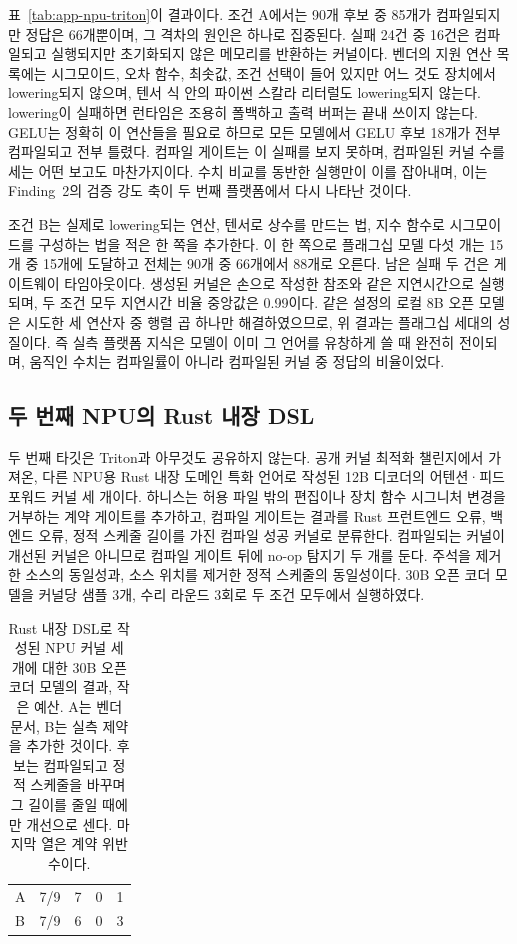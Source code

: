 표~\ref{tab:app-npu-triton}이 결과이다. 조건 A에서는 90개 후보 중 85개가 컴파일되지만 정답은 66개뿐이며,
그 격차의 원인은 하나로 집중된다. 실패 24건 중 16건은 컴파일되고 실행되지만 초기화되지 않은 메모리를
반환하는 커널이다. 벤더의 지원 연산 목록에는 시그모이드, 오차 함수, 최솟값, 조건 선택이 들어 있지만 어느
것도 장치에서 lowering되지 않으며, 텐서 식 안의 파이썬 스칼라 리터럴도 lowering되지 않는다. lowering이
실패하면 런타임은 조용히 폴백하고 출력 버퍼는 끝내 쓰이지 않는다. GELU는 정확히 이 연산들을 필요로 하므로
모든 모델에서 GELU 후보 18개가 전부 컴파일되고 전부 틀렸다. 컴파일 게이트는 이 실패를 보지 못하며,
컴파일된 커널 수를 세는 어떤 보고도 마찬가지이다. 수치 비교를 동반한 실행만이 이를 잡아내며, 이는
Finding~2의 검증 강도 축이 두 번째 플랫폼에서 다시 나타난 것이다.

조건 B는 실제로 lowering되는 연산, 텐서로 상수를 만드는 법, 지수 함수로 시그모이드를 구성하는 법을 적은
한 쪽을 추가한다. 이 한 쪽으로 플래그십 모델 다섯 개는 15개 중 15개에 도달하고 전체는 90개 중 66개에서
88개로 오른다. 남은 실패 두 건은 게이트웨이 타임아웃이다. 생성된 커널은 손으로 작성한 참조와 같은
지연시간으로 실행되며, 두 조건 모두 지연시간 비율 중앙값은 0.99이다. 같은 설정의 로컬 8B 오픈 모델은
시도한 세 연산자 중 행렬 곱 하나만 해결하였으므로, 위 결과는 플래그십 세대의 성질이다. 즉 실측 플랫폼
지식은 모델이 이미 그 언어를 유창하게 쓸 때 완전히 전이되며, 움직인 수치는 컴파일률이 아니라 컴파일된
커널 중 정답의 비율이었다.

\subsection{두 번째 NPU의 Rust 내장 DSL}\label{sec:app-npu-dsl}

두 번째 타깃은 Triton과 아무것도 공유하지 않는다. 공개 커널 최적화 챌린지에서 가져온, 다른 NPU용 Rust
내장 도메인 특화 언어로 작성된 12B 디코더의 어텐션·피드포워드 커널 세 개이다. 하니스는 허용 파일 밖의
편집이나 장치 함수 시그니처 변경을 거부하는 계약 게이트를 추가하고, 컴파일 게이트는 결과를 Rust
프런트엔드 오류, 백엔드 오류, 정적 스케줄 길이를 가진 컴파일 성공 커널로 분류한다. 컴파일되는 커널이
개선된 커널은 아니므로 컴파일 게이트 뒤에 no-op 탐지기 두 개를 둔다. 주석을 제거한 소스의 동일성과, 소스
위치를 제거한 정적 스케줄의 동일성이다. 30B 오픈 코더 모델을 커널당 샘플 3개, 수리 라운드 3회로 두 조건
모두에서 실행하였다.

\begin{table}[t]
\centering
\small
\setlength{\tabcolsep}{5pt}
\caption{Rust 내장 DSL로 작성된 NPU 커널 세 개에 대한 30B 오픈 코더 모델의 결과, 작은 예산. A는 벤더
문서, B는 실측 제약을 추가한 것이다. 후보는 컴파일되고 정적 스케줄을 바꾸며 그 길이를 줄일 때에만
개선으로 센다. 마지막 열은 계약 위반 수이다.}
\label{tab:app-npu-dsl}
\begin{tabular}{@{}lrrrr@{}}
\toprule
\headrow{조건} & \headrow{컴파일} & \headrow{No-op} & \headrow{개선} & \headrow{위반} \\
\midrule
A & 7/9 & 7 & 0 & 1 \\
B & 7/9 & 6 & 0 & 3 \\
\bottomrule
\end{tabular}
\end{table}

